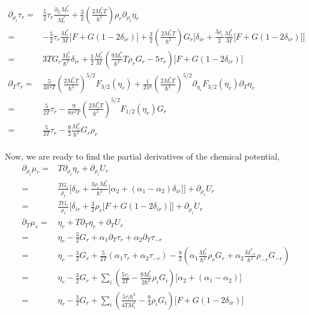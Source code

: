 \documentclass[preprint,prc,preprintnumbers,superscriptaddress,amsmath,amssymb,floatfix]{revtex4-1}
\begin{document}
\begin{equation}
 \begin{split}
 \partial_{\rho_i}\tau_r=&\frac{5}{2}\tau_r\frac{\partial_{\rho_i}M_r^{*}}{ M_r^{*}}+\frac{3}{2}(\frac{2M_r^{*}T}{\hbar^2})\rho_r\partial_{\rho_i}\eta_r\\
 =&-\frac{5}{2}\tau_r\frac{M_r^{*}}{M}\big[F+G(1-2\delta_{ir})\big]+\frac{3}{2}(\frac{2M_r^{*}T}{\hbar^2})G_r\Big[\delta_{ir}+\frac{3\rho_r}{2}\frac{M_r^{*}}{M}\big[F+G(1-2\delta_{ir})\big]\Big]\\
  =&3 T G_r\frac{M_r^{*}}{\hbar^2} \delta_{ir} +\frac{1}{2}\frac{M_r^{*}}{M}(\frac{9 M_r^{*}}{\hbar^2} T \rho_r G_r - 5 \tau_r)\big[F+G(1-2\delta_{ir})\big]\\
  \partial_{T}\tau_r=&\frac{5}{4\pi^2 T}(\frac{2 M^{*}_rT}{\hbar^2})^{5/2} F_{3/2}(\eta_r)+\frac{1}{2\pi^2}(\frac{2 M_r^{*}T}{\hbar^2})^{5/2}\partial_{\eta_r}F_{3/2}(\eta_r)\partial_{T}\eta_r\\
  =&\frac{5}{2T}\tau_r-\frac{9}{8\pi^2 T}(\frac{2 M^{*}_rT}{\hbar^2})^{5/2} F_{1/2}(\eta_r)G_r\\
  =&\frac{5}{2T}\tau_r-\frac{9}{2}\frac{M_r^{*}}{\hbar^2}G_r\rho_r\\
 \end{split}
\end{equation}

Now, we are ready to find the partial derivatives of the chemical potential,
\begin{equation}
 \begin{split}
  \partial_{\rho_i}\mu_r =& T\partial_{\rho_i}\eta_r + \partial_{\rho_i} U_r\\
  =&\frac{TG_r}{\rho_r}\Big[\delta_{ir}+\frac{3 \rho_r M_r^{*}}{\hbar^2}\big[\alpha_2+(\alpha_1-\alpha_2)\delta_{ir}\big]\Big] + \partial_{\rho_i} U_r\\
  =&\frac{TG_r}{\rho_r}\Big[\delta_{ir}+\frac{3}{2}\rho_r\big[F+G(1-2\delta_{ir})\big]\Big] + \partial_{\rho_i} U_r\\
  \partial_{T}\mu_r=& \eta_r + T \partial_{T}\eta_r +\partial_{T}U_r\\
  =&\eta_r - \frac{3}{2}G_r+\alpha_1 \partial_{T}\tau_r+\alpha_2 \partial_{T}\tau_{-r}\\
  =&\eta_r - \frac{3}{2}G_r+\frac{5}{2T}(\alpha_1\tau_r+\alpha_2\tau_{-r})- \frac{9}{2} (\alpha_1 \frac{M_r^{*}}{\hbar^2}\rho_r G_r+\alpha_2 \frac{M_{-r}^{*}}{\hbar^2}\rho_{-r} G_{-r})\\
  =&\eta_r - \frac{3}{2}G_r+\sum_i (\frac{5\tau_i}{2T}-\frac{9M_i^{*}}{2 \hbar^2}\rho_i G_i) \big[\alpha_2+(\alpha_1-\alpha_2)\big]\\
  =&\eta_r - \frac{3}{2}G_r+\sum_i (\frac{5\tau_i \hbar^2}{4TM_i^{*}}-\frac{9}{4}\rho_iG_i) \big[F+G(1-2\delta_{ir})\big]
 \end{split}
\end{equation}
\end{document}
